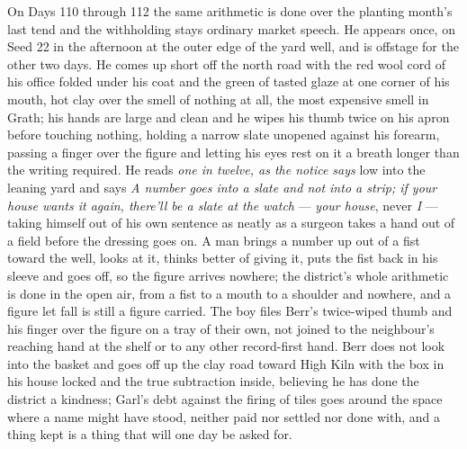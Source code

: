 \documentclass{design/chronicle}
\begin{document}
{On Days 110 through 112 the same arithmetic is done over the planting month’s last tend and the withholding stays ordinary market speech. He appears once, on Seed 22 in the afternoon at the outer edge of the yard well, and is offstage for the other two days. He comes up short off the north road with the red wool cord of his office folded under his coat and the green of tasted glaze at one corner of his mouth, hot clay over the smell of nothing at all, the most expensive smell in Grath; his hands are large and clean and he wipes his thumb twice on his apron before touching nothing, holding a narrow slate unopened against his forearm, passing a finger over the figure and letting his eyes rest on it a breath longer than the writing required. He reads \emph{one in twelve, as the notice says} low into the leaning yard and says \emph{A number goes into a slate and not into a strip; if your house wants it again, there’ll be a slate at the watch} — \emph{your house}, never \emph{I} — taking himself out of his own sentence as neatly as a surgeon takes a hand out of a field before the dressing goes on. A man brings a number up out of a fist toward the well, looks at it, thinks better of giving it, puts the fist back in his sleeve and goes off, so the figure arrives nowhere; the district’s whole arithmetic is done in the open air, from a fist to a mouth to a shoulder and nowhere, and a figure let fall is still a figure carried. The boy files Berr’s twice-wiped thumb and his finger over the figure on a tray of their own, not joined to the neighbour’s reaching hand at the shelf or to any other record-first hand. Berr does not look into the basket and goes off up the clay road toward High Kiln with the box in his house locked and the true subtraction inside, believing he has done the district a kindness; Garl’s debt against the firing of tiles goes around the space where a name might have stood, neither paid nor settled nor done with, and a thing kept is a thing that will one day be asked for.

}
\end{document}
